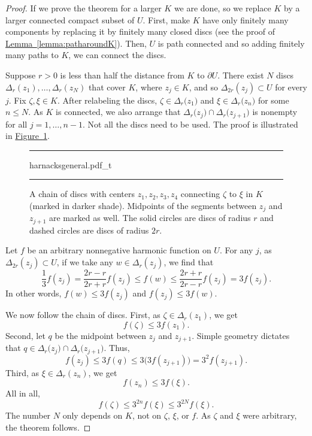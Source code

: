 \documentclass[12pt,openany]{book}
\theoremstyle{plain}
\theoremstyle{remark}
\theoremstyle{definition}
\newenvironment{myfig}{%
\begin{figure}[h!t]
\noindent\rule{\textwidth}{0.5pt}\vspace{12pt}\par\centering}%
{\par\noindent\rule{\textwidth}{0.5pt}
\end{figure}}
\theoremstyle{exercise}
\theoremstyle{example}
\newcommand{\figureref}[1]{\hyperref[#1]{Figure~\ref*{#1}}}
\newcommand{\lemmaref}[1]{\hyperref[#1]{Lemma~\ref*{#1}}}
\begin{document}
\begin{proof}
If we prove the theorem for a larger $K$ we are done, so we
replace $K$ by a larger connected compact subset of $U$.
First, make $K$ have only finitely many components by replacing it
by finitely many closed discs
(see the proof of \lemmaref{lemma:patharoundK}).  Then, $U$ is path
connected and so adding finitely many paths to $K$, we can connect
the discs.

Suppose $r> 0$ is less than half the distance from $K$ to $\partial U$.
There exist $N$ discs $\Delta_{r}(z_1),\ldots,\Delta_{r}(z_N)$ that cover $K$,
where $z_j \in K$, and so $\Delta_{2r}(z_j) \subset U$ for every $j$.
Fix $\zeta,\xi \in K$.  After relabeling the discs,
$\zeta \in \Delta_{r}\bigl(z_{1}\bigr)$
and
$\xi \in \Delta_{r}\bigl(z_{n}\bigr)$ for some $n \leq N$.
As $K$ is connected, we also arrange that
$\Delta_{r}\bigl(z_{j}\bigr) \cap \Delta_{r}\bigl(z_{j+1}\bigr)$
is nonempty for all $j=1,\ldots,n-1$.
Not all the discs need to be used.
The proof is illustrated in \figureref{fig:harnacksgeneral}.

\begin{myfig}
{harnacksgeneral.pdf_t}
\caption{A chain of discs with centers $z_1,z_2,z_3,z_4$ connecting
$\zeta$ to $\xi$ in $K$ (marked in darker shade).  Midpoints of the segments
between $z_j$ and $z_{j+1}$ are marked as well.
The solid circles are discs of radius $r$ and
dashed circles are discs of radius $2r$.\label{fig:harnacksgeneral}}
\end{myfig}

Let $f$ be an arbitrary nonnegative harmonic function on $U$.
For any $j$, as $\Delta_{2r}(z_j) \subset U$, if we take any $w \in
\Delta_r(z_j)$, we find that 
\begin{equation*}
\frac{1}{3} f(z_j) = 
\frac{2r-r}{2r+r} f(z_j)
\leq
f(w)
\leq \frac{2r+r}{2r-r} f(z_j)
= 3 f(z_j) .
\end{equation*}
In other words, $f(w) \leq 3 f(z_j)$ and $f(z_j) \leq 3 f(w)$.

We now follow the chain of discs.
First, as $\zeta \in \Delta_r(z_1)$, we get 
\begin{equation*}
f(\zeta) \leq 3 f(z_1).
\end{equation*}
Second, let
$q$ be the midpoint between $z_{j}$ and $z_{j+1}$.
Simple geometry dictates that
$q \in \Delta_{r}\bigl(z_{j}\bigr) \cap \Delta_{r}\bigl(z_{j+1}\bigr)$.
Thus,
\begin{equation*}
f(z_j) \leq 3 f(q) \leq 3 \bigl( 3 f(z_{j+1}) \bigr) = 3^2 f(z_{j+1}).
\end{equation*}
Third, as $\xi \in \Delta_r(z_n)$, we get 
\begin{equation*}
f(z_n) \leq 3 f(\xi).
\end{equation*}
All in all,
\begin{equation*}
f(\zeta) \leq
3^{2n}
f(\xi)
\leq
3^{2N}
f(\xi) .
\end{equation*}
The number $N$ only depends on $K$, not on $\zeta$, $\xi$, or $f$.
As $\zeta$ and $\xi$ were arbitrary, the theorem follows.
\end{proof}
\end{document}

